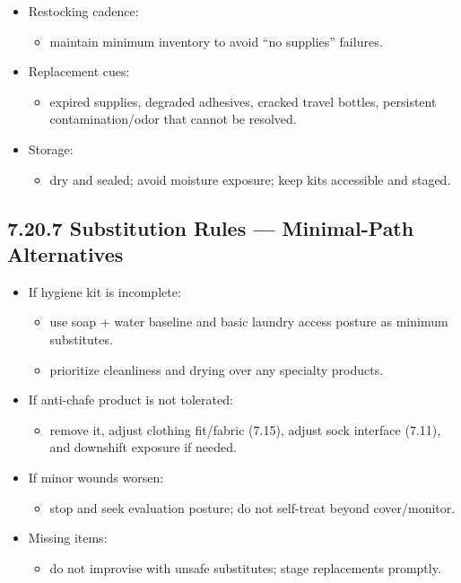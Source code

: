 \documentclass[10pt]{article}
\begin{document}
\begin{itemize}
\item Restocking cadence:
  \begin{itemize}
  \item maintain minimum inventory to avoid “no supplies” failures.
  \end{itemize}
\item Replacement cues:
  \begin{itemize}
  \item expired supplies, degraded adhesives, cracked travel bottles, persistent contamination/odor that cannot be resolved.
  \end{itemize}
\item Storage:
  \begin{itemize}
  \item dry and sealed; avoid moisture exposure; keep kits accessible and staged.
  \end{itemize}
\end{itemize}

\subsection*{7.20.7 Substitution Rules — Minimal-Path Alternatives}
{}

\begin{itemize}
\item If hygiene kit is incomplete:
  \begin{itemize}
  \item use soap + water baseline and basic laundry access posture as minimum substitutes.
  \item prioritize cleanliness and drying over any specialty products.
  \end{itemize}
\item If anti-chafe product is not tolerated:
  \begin{itemize}
  \item remove it, adjust clothing fit/fabric (7.15), adjust sock interface (7.11), and downshift exposure if needed.
  \end{itemize}
\item If minor wounds worsen:
  \begin{itemize}
  \item stop and seek evaluation posture; do not self-treat beyond cover/monitor.
  \end{itemize}
\item Missing items:
  \begin{itemize}
  \item do not improvise with unsafe substitutes; stage replacements promptly.
  \end{itemize}
\end{itemize}
\end{document}
